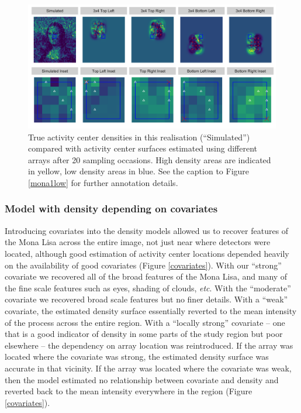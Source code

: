 \documentclass[a4paper,12pt]{article}
\begin{document}
\begin{figure}[htbp]
\centering
\includegraphics[width=1\textwidth]{many_faces_mona_higheffort.png}
\caption{True activity center densities in this realisation (``Simulated'') compared with activity center surfaces estimated using different arrays after 20 sampling occasions. High density areas are indicated in yellow, low density areas in blue. See the caption to Figure \ref{mona1low} for further annotation details.}
\label{mona1hi}
\end{figure}

\subsubsection{Model with density depending on covariates}
Introducing covariates into the density models allowed us to recover features of the Mona Lisa across the entire image, not just near where detectors were located, although good estimation of activity center locations depended heavily on the availability of good covariates (Figure \ref{covariates}). With our ``strong'' covariate we recovered all of the broad features of the Mona Lisa, and many of the fine scale features such as eyes, shading of clouds, {\it etc}. With the ``moderate'' covariate we recovered broad scale features but no finer details. With a ``weak'' covariate, the estimated density surface essentially reverted to the mean intensity of the process across the entire region. With a ``locally strong'' covariate -- one that is a good indicator of density in some parts of the study region but poor elsewhere -- the dependency on array location was reintroduced. If the array was located where the covariate was strong, the estimated density surface was accurate in that vicinity. If the array was located where the covariate was weak, then the model estimated no relationship between covariate and density and reverted back to the mean intensity everywhere in the region (Figure \ref{covariates}). 
\end{document}
